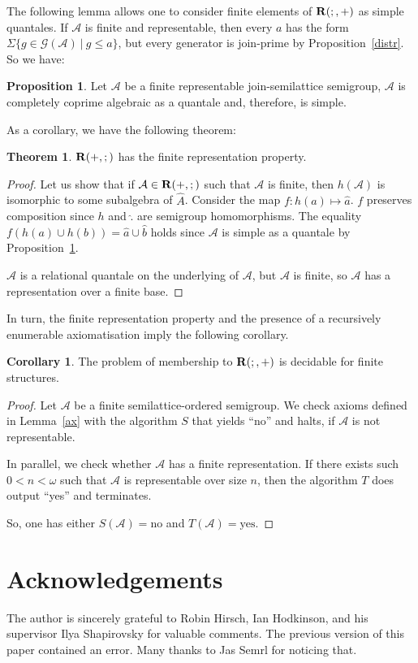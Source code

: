 \documentclass[a4paper]{article}
\theoremstyle{definition}
\theoremstyle{theorem}
\newtheorem{theorem}{Theorem}
\theoremstyle{proposition}
\newtheorem{proposition}{Proposition}
\theoremstyle{lemma}
\theoremstyle{ex}
\theoremstyle{corollary}
\newtheorem{corollary}{Corollary}
\theoremstyle{claim}
\begin{document}
The following lemma allows one to consider finite elements of ${\bf R}(;,+)$ as simple quantales. If $\mathcal{A}$ is finite and representable, then every $a$ has the form $\Sigma \{ g \in \mathcal{G}(\mathcal{A}) \: | \: g \leq a \}$, but every generator is join-prime by Proposition~\ref{distr}. So we have:

\begin{proposition}\label{quantalerepisok}
  Let $\mathcal{A}$ be a finite representable join-semilattice semigroup, $\mathcal{A}$ is completely coprime algebraic as a quantale and, therefore, is simple.
\end{proposition}

As a corollary, we have the following theorem:

\begin{theorem}
  ${\bf R}(+, ;)$ has the finite representation property.
\end{theorem}

\begin{proof}
  Let us show that if $\mathcal{A} \in {\bf R}(+, ;)$ such that $\mathcal{A}$ is finite, then
  $h(\mathcal{A})$ is isomorphic to some subalgebra of $\widehat{A}$. Consider the map
  $f : h(a) \mapsto \hat{a}$. $f$ preserves composition since $h$ and $\hat{.}$ are semigroup homomorphisms. The equality $f(h(a) \cup h(b)) = \hat{a} \cup \hat{b}$ holds since $\mathcal{A}$ is simple as a quantale by Proposition~\ref{quantalerepisok}.

  $\mathcal{A}$ is a relational quantale on the underlying of $\mathcal{A}$, but $\mathcal{A}$ is finite, so $\mathcal{A}$ has a representation over a finite base.
\end{proof}

In turn, the finite representation property and the presence of a recursively enumerable axiomatisation imply the following corollary.

\begin{corollary}
  The problem of membership to ${\bf R}(;, +)$ is decidable for finite structures.
\end{corollary}

\begin{proof}
  Let $\mathcal{A}$ be a finite semilattice-ordered semigroup. We check axioms defined in Lemma~\ref{ax} with the algorithm $S$ that yields ``no'' and halts, if $\mathcal{A}$ is not representable.

  In parallel, we check whether $\mathcal{A}$ has a finite representation. If there exists such $0 < n < \omega$ such that $\mathcal{A}$ is representable over size $n$, then the algorithm $T$ does output ``yes'' and terminates.

  So, one has either $S(\mathcal{A}) = \text{no}$ and $T(\mathcal{A}) = \text{yes}$.
\end{proof}


\section{Acknowledgements}

The author is sincerely grateful to Robin Hirsch, Ian Hodkinson, and his supervisor Ilya Shapirovsky for valuable comments. The previous version of this paper contained an error. Many thanks to Jas Semrl for noticing that.



\end{document}
